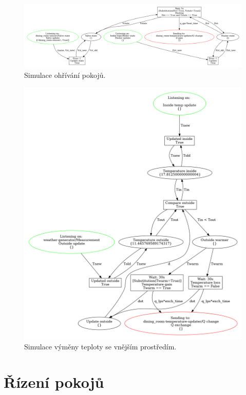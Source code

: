\begin{figure}[htb] %
 \centering
 \includegraphics[width=\textwidth]{obrazky-figures/room-heating.png}
 \caption{Simulace ohřívání pokojů.}
 \label{heater-viz}
\end{figure}

\begin{figure}[htb]
 \centering
 \includegraphics[width=\textwidth]{obrazky-figures/room-exchange.png}
 \caption{Simulace výměny teploty se vnějším prostředím.}
 \label{exchange-viz}
\end{figure}


\section{Řízení pokojů}
\label{sec:server-details}

